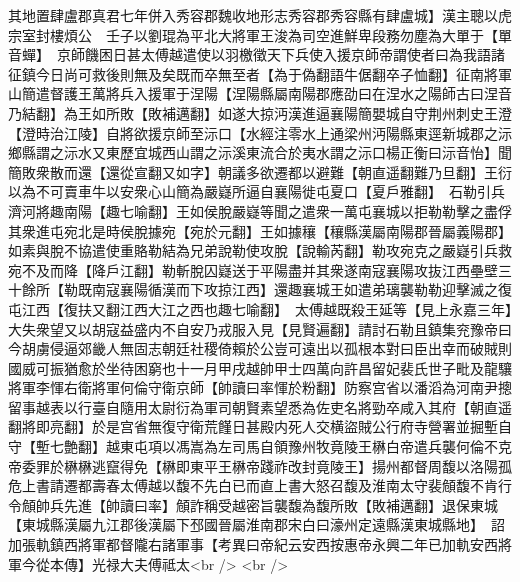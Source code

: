 其地置肆盧郡真君七年併入秀容郡魏收地形志秀容郡秀容縣有肆盧城】漢主聰以虎宗室封樓煩公　壬子以劉琨為平北大將軍王浚為司空進鮮卑段務勿塵為大單于【單音蟬】　京師饑困日甚太傅越遣使以羽檄徵天下兵使入援京師帝謂使者曰為我語諸征鎮今日尚可救後則無及矣既而卒無至者【為于偽翻語牛倨翻卒子恤翻】征南將軍山簡遣督護王萬將兵入援軍于涅陽【涅陽縣屬南陽郡應劭曰在涅水之陽師古曰涅音乃結翻】為王如所敗【敗補邁翻】如遂大掠沔漢進逼襄陽簡嬰城自守荆州刺史王澄【澄時治江陵】自將欲援京師至沶口【水經注零水上通梁州沔陽縣東逕新城郡之沶鄉縣謂之沶水又東歷宜城西山謂之沶溪東流合於夷水謂之沶口楊正衡曰沶音怡】聞簡敗衆散而還【還從宣翻又如字】朝議多欲遷都以避難【朝直遥翻難乃旦翻】王衍以為不可賣車牛以安衆心山簡為嚴嶷所逼自襄陽徙屯夏口【夏戶雅翻】　石勒引兵濟河將趣南陽【趣七喻翻】王如侯脫嚴嶷等聞之遣衆一萬屯襄城以拒勒勒擊之盡俘其衆進屯宛北是時侯脫據宛【宛於元翻】王如據穰【穰縣漢屬南陽郡晉屬義陽郡】如素與脫不協遣使重賂勒結為兄弟說勒使攻脫【說輸芮翻】勒攻宛克之嚴嶷引兵救宛不及而降【降戶江翻】勒斬脫囚嶷送于平陽盡并其衆遂南寇襄陽攻抜江西壘壁三十餘所【勒既南寇襄陽循漢而下攻掠江西】還趣襄城王如遣弟璃襲勒勒迎擊滅之復屯江西【復扶又翻江西大江之西也趣七喻翻】　太傅越既殺王延等【見上永嘉三年】大失衆望又以胡寇益盛内不自安乃戎服入見【見賢遍翻】請討石勒且鎮集兖豫帝曰今胡虜侵逼郊畿人無固志朝廷社稷倚賴於公豈可遠出以孤根本對曰臣出幸而破賊則國威可振猶愈於坐待困窮也十一月甲戌越帥甲士四萬向許昌留妃裴氏世子毗及龍驤將軍李惲右衛將軍何倫守衛京師【帥讀曰率惲於粉翻】防察宫省以潘滔為河南尹摠留事越表以行臺自隨用太尉衍為軍司朝賢素望悉為佐吏名將勁卒咸入其府【朝直遥翻將即亮翻】於是宫省無復守衛荒饉日甚殿内死人交横盜賊公行府寺營署並掘塹自守【塹七艶翻】越東屯項以馮嵩為左司馬自領豫州牧竟陵王楙白帝遣兵襲何倫不克帝委罪於楙楙逃竄得免【楙即東平王楙帝踐祚改封竟陵王】揚州都督周馥以洛陽孤危上書請遷都壽春太傅越以馥不先白已而直上書大怒召馥及淮南太守裴頠馥不肯行令頠帥兵先進【帥讀曰率】頠詐稱受越密旨襲馥為馥所敗【敗補邁翻】退保東城【東城縣漢屬九江郡後漢屬下邳國晉屬淮南郡宋白曰濠州定遠縣漢東城縣地】　詔加張軌鎮西將軍都督隴右諸軍事【考異曰帝紀云安西按惠帝永興二年已加軌安西將軍今從本傳】光禄大夫傅祗太<br />
<br />
